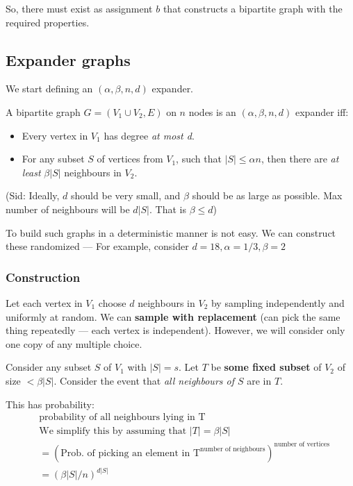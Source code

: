So, there must exist as assignment $b$ that constructs a bipartite graph
with the required properties.

\subsection{Expander graphs}
We start defining an $(\alpha, \beta, n, d)$ expander.

A bipartite graph $G = (V_1 \cup V_2, E)$ on $n$ nodes is an $(\alpha, \beta, n, d)$
expander iff:
\begin{itemize}
\item Every vertex in $V_1$ has degree \textit{at most d}.
\item For any subset $S$ of vertices from $V_1$, such that $|S| \leq \alpha n$, 
then there are \textit{at least} $\beta |S|$ neighbours in $V_2$.
\end{itemize}

(Sid: Ideally, $d$ should be very small, and $\beta$ should be as large as possible.
Max number of neighbours will be $d |S|$. That is $\beta \leq d$)

To build such graphs in a deterministic manner is not easy. We can construct
these randomized --- For example, consider $d = 18, \alpha = 1/3, \beta = 2$

\subsubsection{Construction}
Let each vertex in $V_1$ choose $d$ neighbours in $V_2$ by sampling
independently and uniformly at random. We can \textbf{sample with replacement}
(can pick the same thing repeatedly --- each vertex is independent). However,
we will consider only one copy of any multiple choice.

Consider any subset $S$ of $V_1$ with $|S| = s$. Let $T$ be 
\textbf{some fixed subset} of $V_2$ of size $< \beta |S|$. 
Consider the event that \textit{all neighbours of $S$} are in $T$. 

This has probability:
\begin{align*}
&\text{probability of all neighbours lying in T} \\
&\text{We simplify this by assuming that $|T| = \beta |S|$} \\
&=(\text{Prob. of picking an element in T}^\text{number of neighbours})^\text{number of vertices} \\
&=(\beta |S| / n)^{d |S|}
\end{align*}

